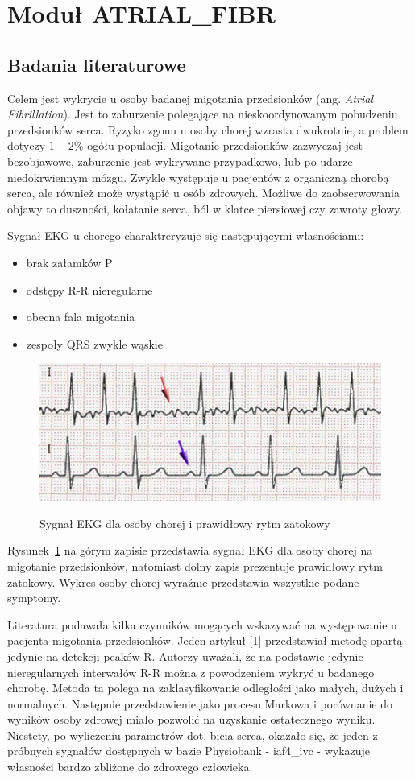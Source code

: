 \section{Moduł ATRIAL\_FIBR}
\subsection{Badania literaturowe}
Celem jest wykrycie u osoby badanej migotania przedsionków (ang. \textit{Atrial Fibrillation}). 
Jest to zaburzenie polegające na nieskoordynowanym pobudzeniu przedsionków serca. 
Ryzyko zgonu u osoby chorej wzrasta dwukrotnie, a problem dotyczy $1-2\%$ ogółu populacji.
Migotanie przedsionków zazwyczaj jest bezobjawowe, zaburzenie jest wykrywane przypadkowo,
lub po udarze niedokrwiennym mózgu.
Zwykle występuje u pacjentów z organiczną chorobą serca, ale również może wystąpić u osób zdrowych.
Możliwe do zaobserwowania objawy to duszności, kołatanie serca, ból w klatce piersiowej czy zawroty głowy.

Sygnał EKG u chorego charaktreryzuje się następującymi własnościami:
\begin{itemize}
  \item brak załamków P
  \item odstępy R-R nieregularne
  \item obecna fala migotania
  \item zespoły QRS zwykle wąskie
\end{itemize}
\begin{figure}[ht]
\centering
\includegraphics{ATRIAL_FIBR/img/AF_ecg.jpg}
\label{fig:AF_ecg}
\caption{Sygnał EKG dla osoby chorej i prawidłowy rytm zatokowy}
\end{figure}

Rysunek~\ref{fig:AF_ecg} na górym zapisie przedstawia sygnał EKG dla osoby chorej na migotanie przedsionków,
natomiast dolny zapis prezentuje prawidłowy rytm zatokowy.
Wykres osoby chorej wyraźnie przedstawia wszystkie podane symptomy.

Literatura podawała kilka czynników mogących wskazywać na występowanie u pacjenta migotania przedsionków. 
Jeden artykuł [1] przedstawiał metodę opartą jedynie na detekcji peaków R. 
Autorzy uważali, że na podstawie jedynie nieregularnych interwałów R-R 
można z powodzeniem wykryć u badanego chorobę. 
Metoda ta polega na zaklasyfikowanie odległości jako małych, dużych i normalnych. 
Następnie przedstawienie jako procesu Markowa i porównanie do wyników osoby zdrowej miało pozwolić 
na uzyskanie ostatecznego wyniku.
Niestety, po wyliczeniu parametrów dot. bicia serca, 
okazało się, że jeden z próbnych sygnałów dostępnych w bazie Physiobank - 
iaf4\_ivc - wykazuje własności bardzo zbliżone do zdrowego człowieka.

